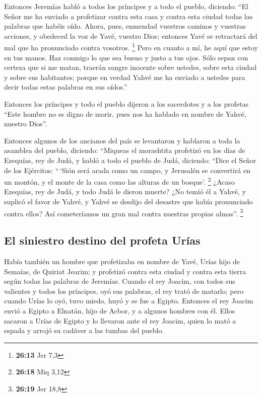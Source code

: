 \begin{paracol}{2}
 Entonces Jeremías habló a todos los príncipes y a todo
el pueblo, diciendo: ``El Señor me ha enviado a profetizar contra esta
casa y contra esta ciudad todas las palabras que habéis oído.
 Ahora, pues, enmendad vuestros caminos y vuestras
acciones, y obedeced la voz de Yavé, vuestro Dios; entonces Yavé se
retractará del mal que ha pronunciado contra vosotros. \footnote{\textbf{26:13}
  Jer 7,3}  Pero en cuanto a mí, he aquí que estoy en tus
manos. Haz conmigo lo que sea bueno y justo a tus ojos. 
Sólo sepan con certeza que si me matan, traerán sangre inocente sobre
ustedes, sobre esta ciudad y sobre sus habitantes; porque en verdad
Yahvé me ha enviado a ustedes para decir todas estas palabras en sus
oídos.''

 Entonces los príncipes y todo el pueblo dijeron a los
sacerdotes y a los profetas ``Este hombre no es digno de morir, pues nos
ha hablado en nombre de Yahvé, nuestro Dios''.

 Entonces algunos de los ancianos del país se levantaron
y hablaron a toda la asamblea del pueblo, diciendo: 
``Miqueas el morashtita profetizó en los días de Ezequías, rey de Judá,
y habló a todo el pueblo de Judá, diciendo: ``Dice el Señor de los
Ejércitos: ``\,`Sión será arada como un campo, y Jerusalén se convertirá
en un montón, y el monte de la casa como las alturas de un bosque'.
\footnote{\textbf{26:18} Miq 3,12}  ¿Acaso Ezequías, rey
de Judá, y todo Judá le dieron muerte? ¿No temió él a Yahvé, y suplicó
el favor de Yahvé, y Yahvé se desdijo del desastre que había pronunciado
contra ellos? Así cometeríamos un gran mal contra nuestras propias
almas''. \footnote{\textbf{26:19} Jer 18,8}

\hypertarget{el-siniestro-destino-del-profeta-uruxedas}{%
\subsection{El siniestro destino del profeta
Urías}\label{el-siniestro-destino-del-profeta-uruxedas}}

 Había también un hombre que profetizaba en nombre de
Yavé, Urías hijo de Semaías, de Quiriat Jearim; y profetizó contra esta
ciudad y contra esta tierra según todas las palabras de Jeremías.
 Cuando el rey Joacim, con todos sus valientes y todos
los príncipes, oyó sus palabras, el rey trató de matarlo; pero cuando
Urías lo oyó, tuvo miedo, huyó y se fue a Egipto. 
Entonces el rey Joacim envió a Egipto a Elnatán, hijo de Acbor, y a
algunos hombres con él.  Ellos sacaron a Urías de Egipto
y lo llevaron ante el rey Joacim, quien lo mató a espada y arrojó su
cadáver a las tumbas del pueblo.


\end{paracol}
